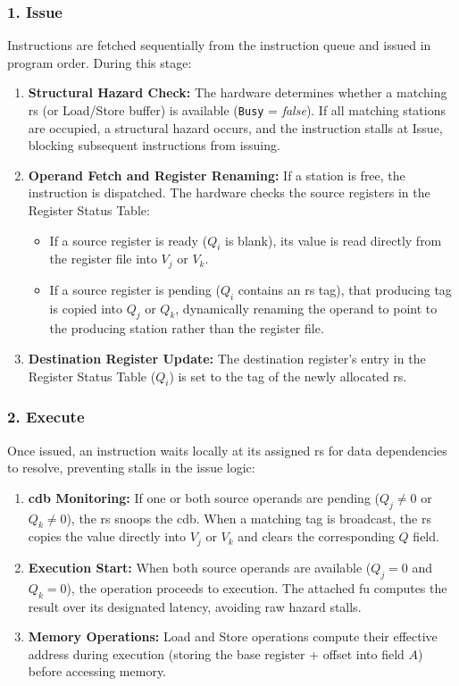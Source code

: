 \subsubsection{1. Issue}
Instructions are fetched sequentially from the instruction queue and issued in program order. During this stage:
\begin{enumerate}
    \item \textbf{Structural Hazard Check:} The hardware determines whether a matching \gls{rs} (or Load/Store buffer) is available (\texttt{Busy} = \textit{false}). If all matching stations are occupied, a structural hazard occurs, and the instruction stalls at Issue, blocking subsequent instructions from issuing.
    \item \textbf{Operand Fetch and Register Renaming:} If a station is free, the instruction is dispatched. The hardware checks the source registers in the Register Status Table:
    \begin{itemize}
        \item If a source register is ready ($Q_i$ is blank), its value is read directly from the register file into $V_j$ or $V_k$.
        \item If a source register is pending ($Q_i$ contains an \gls{rs} tag), that producing tag is copied into $Q_j$ or $Q_k$, dynamically renaming the operand to point to the producing station rather than the register file.
    \end{itemize}
    \item \textbf{Destination Register Update:} The destination register's entry in the Register Status Table ($Q_i$) is set to the tag of the newly allocated \gls{rs}.
\end{enumerate}

\subsubsection{2. Execute}
Once issued, an instruction waits locally at its assigned \gls{rs} for data dependencies to resolve, preventing stalls in the issue logic:
\begin{enumerate}
    \item \textbf{\gls{cdb} Monitoring:} If one or both source operands are pending ($Q_j \neq 0$ or $Q_k \neq 0$), the \gls{rs} snoops the \gls{cdb}. When a matching tag is broadcast, the \gls{rs} copies the value directly into $V_j$ or $V_k$ and clears the corresponding $Q$ field.
    \item \textbf{Execution Start:} When both source operands are available ($Q_j = 0$ and $Q_k = 0$), the operation proceeds to execution. The attached \gls{fu} computes the result over its designated latency, avoiding \gls{raw} hazard stalls.
    \item \textbf{Memory Operations:} Load and Store operations compute their effective address during execution (storing the base register + offset into field $A$) before accessing memory.
\end{enumerate}

